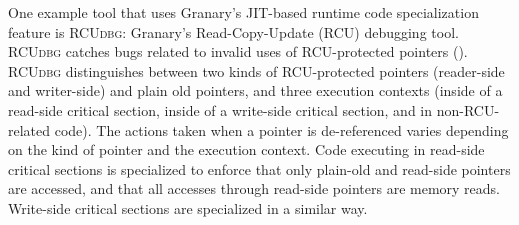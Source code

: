 \documentclass[preprint]{sigplanconf}
\newcommand{\toolname}[1]{{\scshape #1}}
\begin{document}

One example tool that uses Granary's JIT-based runtime code specialization feature is \toolname{RCUdbg}: Granary's Read-Copy-Update (RCU) debugging tool. \toolname{RCUdbg} catches bugs related to invalid uses of RCU-protected pointers (). \toolname{RCUdbg} distinguishes between two kinds of RCU-protected pointers (reader-side and writer-side) and plain old pointers, and three execution contexts (inside of a read-side critical section, inside of a write-side critical section, and in non-RCU-related code). The actions taken when a pointer is de-referenced varies depending on the kind of pointer and the execution context. Code executing in read-side critical sections is specialized to enforce that only plain-old and read-side pointers are accessed, and that all accesses through read-side pointers are memory reads. Write-side critical sections are specialized in a similar way.
\end{document}
